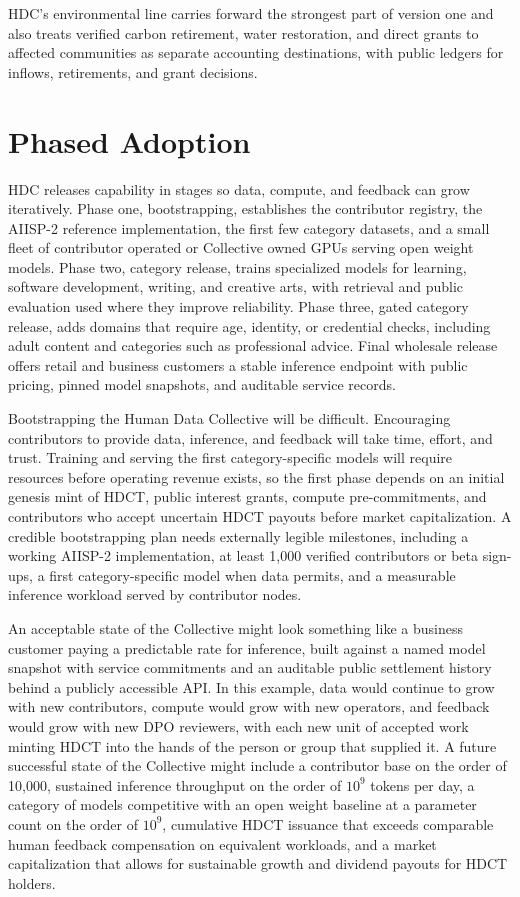 \documentclass[10pt,a4paper,twocolumn]{article}
\begin{document}
HDC's environmental line carries forward the strongest part of version one and also treats verified carbon retirement, water restoration, and direct grants to affected communities as separate accounting destinations, with public ledgers for inflows, retirements, and grant decisions.

\section{Phased Adoption}
\label{sec:phases}

HDC releases capability in stages so data, compute, and feedback can grow iteratively. Phase one, bootstrapping, establishes the contributor registry, the AIISP-2 reference implementation, the first few category datasets, and a small fleet of contributor operated or Collective owned GPUs serving open weight models. Phase two, category release, trains specialized models for learning, software development, writing, and creative arts, with retrieval and public evaluation used where they improve reliability. Phase three, gated category release, adds domains that require age, identity, or credential checks, including adult content and categories such as professional advice. Final wholesale release offers retail and business customers a stable inference endpoint with public pricing, pinned model snapshots, and auditable service records.

Bootstrapping the Human Data Collective will be difficult. Encouraging contributors to provide data, inference, and feedback will take time, effort, and trust. Training and serving the first category-specific models will require resources before operating revenue exists, so the first phase depends on an initial genesis mint of HDCT, public interest grants, compute pre-commitments, and contributors who accept uncertain HDCT payouts before market capitalization. A credible bootstrapping plan needs externally legible milestones, including a working AIISP-2 implementation, at least 1{,}000 verified contributors or beta sign-ups, a first category-specific model when data permits, and a measurable inference workload served by contributor nodes.

An acceptable state of the Collective might look something like a business customer paying a predictable rate for inference, built against a named model snapshot with service commitments and an auditable public settlement history behind a publicly accessible API. In this example, data would continue to grow with new contributors, compute would grow with new operators, and feedback would grow with new DPO reviewers, with each new unit of accepted work minting HDCT into the hands of the person or group that supplied it. A future successful state of the Collective might include a contributor base on the order of 10{,}000, sustained inference throughput on the order of $10^{9}$ tokens per day, a category of models competitive with an open weight baseline at a parameter count on the order of $10^{9}$, cumulative HDCT issuance that exceeds comparable human feedback compensation on equivalent workloads, and a market capitalization that allows for sustainable growth and dividend payouts for HDCT holders.
\end{document}
